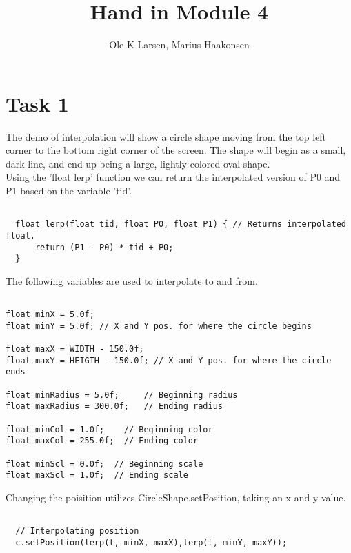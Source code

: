 \documentclass[11pt]{amsart}
\title{Hand in Module 4}
\author{Ole K Larsen, Marius Haakonsen}
\begin{document}
\maketitle

\section{Task 1}

The demo of interpolation will show a circle shape moving from the top left corner to the bottom right corner of the screen.
The shape will begin as a small, dark line, and end up being a large, lightly colored oval shape. \\

Using the 'float lerp' function we can return the interpolated version of P0 and P1 based on the variable 'tid'. \\

\begin{verbatim}

  float lerp(float tid, float P0, float P1) { // Returns interpolated float.
      return (P1 - P0) * tid + P0;
  }

\end{verbatim}

The following variables are used to interpolate to and from. \\

\begin{verbatim}

float minX = 5.0f;
float minY = 5.0f; // X and Y pos. for where the circle begins

float maxX = WIDTH - 150.0f;
float maxY = HEIGTH - 150.0f; // X and Y pos. for where the circle ends

float minRadius = 5.0f;     // Beginning radius
float maxRadius = 300.0f;   // Ending radius

float minCol = 1.0f;    // Beginning color
float maxCol = 255.0f;  // Ending color

float minScl = 0.0f;  // Beginning scale
float maxScl = 1.0f;  // Ending scale

\end{verbatim}

Changing the poisition utilizes CircleShape.setPosition, taking an x and y value. \\

\begin{verbatim}

  // Interpolating position
  c.setPosition(lerp(t, minX, maxX),lerp(t, minY, maxY));

\end{verbatim}
\end{document}
